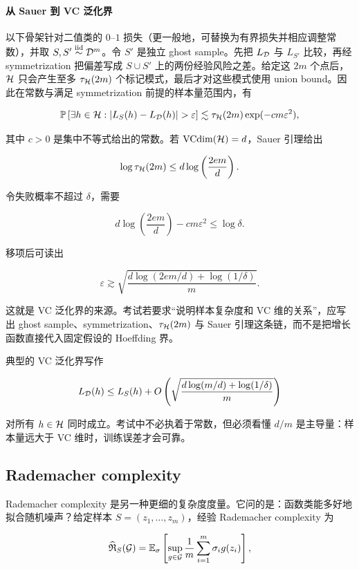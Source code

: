 \paragraph{从 Sauer 到 VC 泛化界}

\proofsketchlabel 以下骨架针对二值类的 \(0\)--\(1\) 损失（更一般地，可替换为有界损失并相应调整常数），并取 \(S,S'\overset{\mathrm{iid}}{\sim}\mathcal{D}^m\)。令 \(S'\) 是独立 ghost sample。先把 \(L_{\mathcal{D}}\) 与 \(L_{S'}\) 比较，再经 symmetrization 把偏差写成 \(S\cup S'\) 上的两份经验风险之差。给定这 \(2m\) 个点后，\(\mathcal{H}\) 只会产生至多 \(\tau_{\mathcal{H}}(2m)\) 个标记模式，最后才对这些模式使用 union bound。因此在常数与满足 symmetrization 前提的样本量范围内，有

\[
  \Pbb\left[
    \exists h\in\Hcal:
    |L_S(h)-L_{\Dcal}(h)|>\varepsilon
  \right]
  \lesssim
  \tau_{\Hcal}(2m)\exp(-c m\varepsilon^2),
\]

其中 \(c>0\) 是集中不等式给出的常数。若 \(\operatorname{VCdim}(\mathcal{H})=d\)，Sauer 引理给出

\[
  \log \tau_{\mathcal{H}}(2m)
  \le
  d\log\left(\frac{2em}{d}\right).
\]

令失败概率不超过 \(\delta\)，需要

\[
  d\log\left(\frac{2em}{d}\right)
  -
  c m\varepsilon^2
  \le
  \log\delta.
\]

移项后可读出

\[
  \varepsilon
  \gtrsim
  \sqrt{
    \frac{
      d\log(2em/d)+\log(1/\delta)
    }{m}
  }.
\]

这就是 VC 泛化界的来源。考试若要求“说明样本复杂度和 VC 维的关系”，应写出 ghost sample、symmetrization、\(\tau_{\mathcal{H}}(2m)\) 与 Sauer 引理这条链，而不是把增长函数直接代入固定假设的 Hoeffding 界。

典型的 VC 泛化界写作

\[
  L_{\mathcal{D}}(h)
  \le
  L_S(h)
  +
  O\left(
    \sqrt{\frac{d\log(m/d)+\log(1/\delta)}{m}}
  \right)
\]

对所有 \(h\in\mathcal{H}\) 同时成立。考试中不必执着于常数，但必须看懂 \(d/m\) 是主导量：样本量远大于 VC 维时，训练误差才会可靠。

\subsection{Rademacher complexity}

Rademacher complexity 是另一种更细的复杂度度量。它问的是：函数类能多好地拟合随机噪声？给定样本 \(S=(z_1,\ldots,z_m)\)，经验 Rademacher complexity 为

\[
  \widehat{\mathfrak{R}}_S(\mathcal{G})
  =
  \mathbb{E}_{\sigma}
  \left[
    \sup_{g\in\mathcal{G}}
    \frac1m
    \sum_{i=1}^{m}\sigma_i g(z_i)
  \right],
\]

